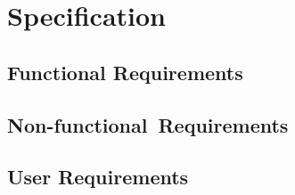 
\chapter{Specification}


    \section{Functional Requirements}

    \section{\mbox{Non-functional Requirements}}

    \section{User Requirements}

